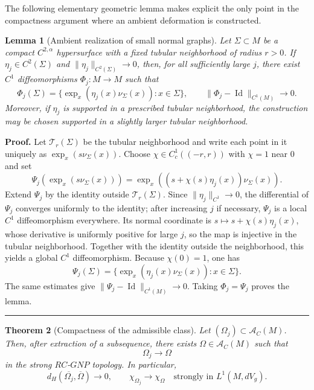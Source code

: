 \documentclass{article}
\newtheorem{theorem}{Theorem}[section]
\newtheorem{lemma}[theorem]{Lemma}
\newenvironment{proof}[1][Proof]{\textbf{#1.} }{\hfill\rule{0.5em}{0.5em}}
\begin{document}
The following elementary geometric lemma makes explicit the only point in the compactness argument where an ambient deformation is constructed.

\begin{lemma}[Ambient realization of small normal graphs]
Let $\Sigma\subset M$ be a compact $C^{2,\alpha}$ hypersurface with a fixed tubular neighborhood of radius $r>0$. If $\eta_j\in C^2(\Sigma)$ and $\|\eta_j\|_{C^2(\Sigma)}\to0$, then, for all sufficiently large $j$, there exist $C^1$ diffeomorphisms $\Phi_j:M\to M$ such that
\[
\Phi_j(\Sigma)=\{\exp_x(\eta_j(x)\nu_\Sigma(x)):x\in\Sigma\},\qquad
\|\Phi_j-\operatorname{Id}\|_{C^1(M)}\to0.
\]
Moreover, if $\eta_j$ is supported in a prescribed tubular neighborhood, the construction may be chosen supported in a slightly larger tubular neighborhood.
\end{lemma}

\begin{proof}
Let $\mathcal T_r(\Sigma)$ be the tubular neighborhood and write each point in it uniquely as $\exp_x(s\nu_\Sigma(x))$. Choose $\chi\in C_c^1((-r,r))$ with $\chi=1$ near $0$ and set
\[
\Psi_j\!\left(\exp_x(s\nu_\Sigma(x))\right)
=
\exp_x\!\left((s+\chi(s)\eta_j(x))\nu_\Sigma(x)\right).
\]
Extend $\Psi_j$ by the identity outside $\mathcal T_r(\Sigma)$. Since $\|\eta_j\|_{C^1}\to0$, the differential of $\Psi_j$ converges uniformly to the identity; after increasing $j$ if necessary, $\Psi_j$ is a local $C^1$ diffeomorphism everywhere. Its normal coordinate is $s\mapsto s+\chi(s)\eta_j(x)$, whose derivative is uniformly positive for large $j$, so the map is injective in the tubular neighborhood. Together with the identity outside the neighborhood, this yields a global $C^1$ diffeomorphism. Because $\chi(0)=1$, one has
\[
\Psi_j(\Sigma)=\{\exp_x(\eta_j(x)\nu_\Sigma(x)):x\in\Sigma\}.
\]
The same estimates give $\|\Psi_j-\operatorname{Id}\|_{C^1(M)}\to0$. Taking $\Phi_j=\Psi_j$ proves the lemma.
\end{proof}

\begin{theorem}[Compactness of the admissible class]
\label{thm:compactness-RC-GNP}
Let $(\Omega_j)\subset\mathcal A_C(M)$. Then, after extraction of a
subsequence, there exists $\Omega\in\mathcal A_C(M)$ such that
\[
\Omega_j\to\Omega
\]
in the strong $RC$-$GNP$ topology. In particular,
\[
d_H(\overline{\Omega_j},\overline\Omega)\to0,
\qquad
\chi_{\Omega_j}\to\chi_\Omega
\quad\text{strongly in }L^1(M,dV_g).
\]
\end{theorem}
\end{document}
